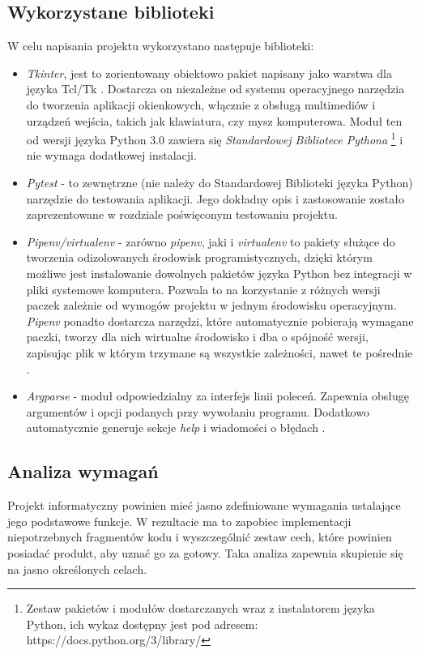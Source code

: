 \subsection{Wykorzystane biblioteki}
W celu napisania projektu wykorzystano następuje biblioteki:
\begin{itemize}
	\item \textit{Tkinter}, jest to zorientowany obiektowo pakiet napisany jako warstwa dla języka Tcl/Tk \cite{TKINTER}. Dostarcza on niezależne od systemu operacyjnego narzędzia do tworzenia aplikacji okienkowych, włącznie z obsługą multimediów i urządzeń wejścia, takich jak klawiatura, czy mysz komputerowa. Moduł ten od wersji języka Python 3.0 zawiera się \textit{Standardowej Bibliotece Pythona} \footnote{Zestaw pakietów i modułów dostarczanych wraz z instalatorem języka Python, ich wykaz dostępny jest pod adresem: https://docs.python.org/3/library/} i nie wymaga dodatkowej instalacji.
	\item \textit{Pytest} - to zewnętrzne (nie należy do Standardowej Biblioteki języka Python) narzędzie do testowania aplikacji. Jego dokładny opis i zastosowanie zostało zaprezentowane w rozdziale poświęconym testowaniu projektu.
	\item \textit{Pipenv/virtualenv} - zarówno \textit{pipenv}, jaki i \textit{virtualenv} to pakiety służące do tworzenia odizolowanych środowisk programistycznych, dzięki którym możliwe jest instalowanie dowolnych pakietów języka Python bez integracji w pliki systemowe komputera. Pozwala to na korzystanie z różnych wersji paczek zależnie od wymogów projektu w jednym środowisku operacyjnym. \textit{Pipenv} ponadto dostarcza narzędzi, które automatycznie pobierają wymagane paczki, tworzy dla nich wirtualne środowisko i dba o spójność wersji, zapisując plik w którym trzymane są wszystkie zależności, nawet te pośrednie \cite{Reitz}.
	\item \textit{Argparse} - moduł odpowiedzialny za interfejs linii poleceń. Zapewnia obsługę argumentów i opcji podanych przy wywołaniu programu. Dodatkowo automatycznie generuje sekcje \textit{help} i wiadomości o błędach \cite{Argparse}.
\end{itemize}

\subsection{Analiza wymagań}
Projekt informatyczny powinien mieć jasno zdefiniowane wymagania ustalające jego podstawowe funkcje. W rezultacie ma to zapobiec implementacji niepotrzebnych fragmentów kodu i wyszczególnić zestaw cech, które powinien posiadać produkt, aby uznać go za gotowy. Taka analiza zapewnia skupienie się na jasno określonych celach.

